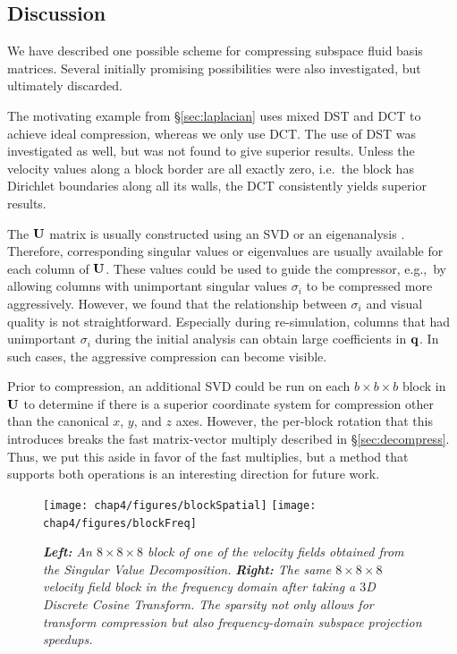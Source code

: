 \subsection{Discussion}

We have described one possible scheme for compressing subspace fluid basis matrices. Several initially promising possibilities were also investigated, but ultimately discarded.

The motivating example from \S\ref{sec:laplacian} uses mixed DST and DCT to achieve ideal compression, whereas we only use DCT. The use of DST was investigated as well, but was not found to give superior results. Unless the velocity values along a block border are all exactly zero, i.e.~the block has Dirichlet boundaries along all its walls, the DCT consistently yields superior results.

The $\mathbf{U}$ matrix is usually constructed using an SVD \cite{Treuille:2006:MRF,Kim2013} or an eigenanalysis \cite{DeWitt:2012,Liu:2015:MVF}. Therefore, corresponding singular values or eigenvalues are usually available for each column of $\mathbf{U}$. These values could be used to guide the compressor, e.g.,~by allowing columns with unimportant singular values $\sigma_i$ to be compressed more aggressively. However, we found that the relationship between $\sigma_i$ and visual quality is not straightforward. Especially during re-simulation, columns that had unimportant $\sigma_i$ during the initial analysis can obtain large coefficients in $\mathbf{q}$. In such cases, the aggressive compression can become visible.

Prior to compression, an additional SVD could be run on each $b \times b \times b$ block in $\mathbf{U}$ to determine if there is a superior coordinate system for compression other than the canonical $x$, $y$, and $z$ axes. However, the per-block rotation that this introduces breaks the fast matrix-vector multiply described in \S\ref{sec:decompress}. Thus, we put this aside in favor of the fast multiplies, but a method that supports both operations is an interesting direction for future work.


\begin{figure}
		\centering
		\texttt{[image: chap4/figures/blockSpatial]}
		\texttt{[image: chap4/figures/blockFreq]}
		\caption{{\em{\bf Left:} An $8 \times 8 \times 8$ block of one of the velocity fields obtained from the Singular Value Decomposition.} {\em{\bf Right:} The same $8 \times 8 \times 8$ velocity field block in the frequency domain after taking a $3$D Discrete Cosine Transform. The sparsity not only allows for transform compression but also frequency-domain subspace projection speedups.}}
		\label{fig:sparseFreq}
\end{figure}













